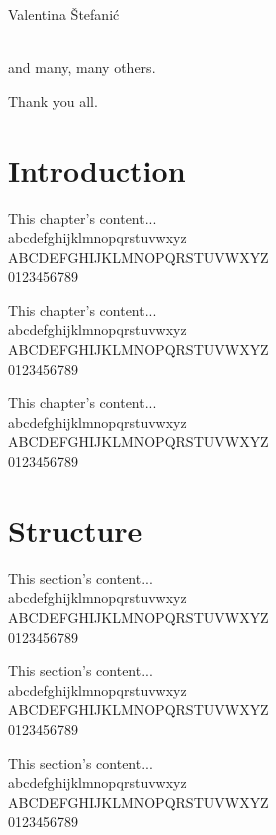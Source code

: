 \documentclass[b5paper,12pt,draft]{book}
\begin{document}
\hfill{Valentina Štefanić} \\
\hspace*{\fill}{Kristina Mlačak} \\
\hspace*{\fill}{Slavko Štefanić}
\vspace*{1.0em}

\hfill{and many, many others.}
\vspace*{1.0em}

\hfill{Thank you all.}
\clearpage

\thispagestyle{empty}
\vspace*{0.1\textheight}
\clearpage

\section{Introduction}
\small{This chapter's content... \\
abcdefghijklmnopqrstuvwxyz \\
ABCDEFGHIJKLMNOPQRSTUVWXYZ \\
0123456789}

\tiny{This chapter's content... \\
abcdefghijklmnopqrstuvwxyz \\
ABCDEFGHIJKLMNOPQRSTUVWXYZ \\
0123456789}

\normalsize{This chapter's content... \\
abcdefghijklmnopqrstuvwxyz \\
ABCDEFGHIJKLMNOPQRSTUVWXYZ \\
0123456789}

\section{Structure}
\small{This section's content... \\
abcdefghijklmnopqrstuvwxyz \\
ABCDEFGHIJKLMNOPQRSTUVWXYZ \\
0123456789}

\tiny{This section's content... \\
abcdefghijklmnopqrstuvwxyz \\
ABCDEFGHIJKLMNOPQRSTUVWXYZ \\
0123456789}

\normalsize{This section's content... \\
abcdefghijklmnopqrstuvwxyz \\
ABCDEFGHIJKLMNOPQRSTUVWXYZ \\
0123456789}
\end{document}
